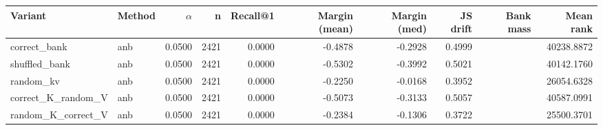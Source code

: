 \begin{tabular}{l l r r r r r r r r}
\toprule
Variant & Method & $\alpha$ & n & Recall@1 & Margin (mean) & Margin (med) & JS drift & Bank mass & Mean rank \\
\midrule
correct\_bank & anb & 0.0500 & 2421 & 0.0000 & -0.4878 & -0.2928 & 0.4999 &  & 40238.8872 \\
shuffled\_bank & anb & 0.0500 & 2421 & 0.0000 & -0.5302 & -0.3992 & 0.5021 &  & 40142.1760 \\
random\_kv & anb & 0.0500 & 2421 & 0.0000 & -0.2250 & -0.0168 & 0.3952 &  & 26054.6328 \\
correct\_K\_random\_V & anb & 0.0500 & 2421 & 0.0000 & -0.5073 & -0.3133 & 0.5057 &  & 40587.0991 \\
random\_K\_correct\_V & anb & 0.0500 & 2421 & 0.0000 & -0.2384 & -0.1306 & 0.3722 &  & 25500.3701 \\
\bottomrule
\end{tabular}
